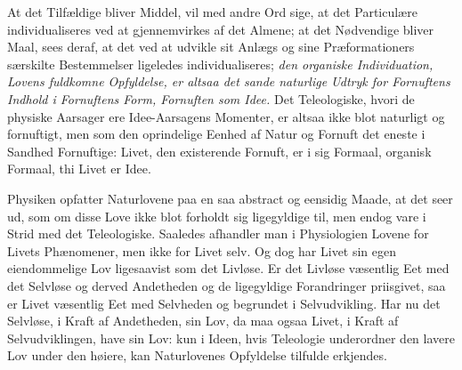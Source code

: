 \documentclass[11pt]{book}
\newcommand{\opage}[1]{\marginnote{\footnotesize\textit{[#1]}}}
\begin{document}
\opage{278} \setcounter{footnote}{0}%
At det Tilfældige bliver Middel, vil med andre Ord sige, at det Particulære
individualiseres ved at gjennemvirkes af det Almene; at det Nødvendige
bliver Maal, sees deraf, at det ved at udvikle sit Anlægs og sine
Præformationers særskilte Bestemmelser ligeledes individualiseres;
\emph{den organiske Individuation, Lovens fuldkomne Opfyldelse, er altsaa
det sande naturlige Udtryk for Fornuftens Indhold i Fornuftens Form,
Fornuften som Idee.} Det Teleologiske, hvori de physiske Aarsager ere
Idee-Aarsagens Momenter, er altsaa ikke blot naturligt og fornuftigt, men
som den oprindelige Eenhed af Natur og Fornuft det eneste i Sandhed
Fornuftige: Livet, den existerende Fornuft, er i sig Formaal, organisk
Formaal, thi Livet er Idee.

Physiken opfatter Naturlovene paa en saa abstract og eensidig Maade, at det
seer ud, som om disse Love ikke blot
\opage{279} \setcounter{footnote}{0}%
forholdt sig ligegyldige til, men endog vare i Strid med det Teleologiske.
Saaledes afhandler man i Physiologien Lovene for Livets Phænomener, men ikke
for Livet selv. Og dog har Livet sin egen eiendommelige Lov ligesaavist som
det Livløse. Er det Livløse væsentlig Eet med det Selvløse og derved
Andetheden og de ligegyldige Forandringer priisgivet, saa er Livet væsentlig
Eet med Selvheden og begrundet i Selvudvikling. Har nu det Selvløse, i Kraft
af Andetheden, sin Lov, da maa ogsaa Livet, i Kraft af Selvudviklingen, have
sin Lov: kun i Ideen, hvis Teleologie underordner den lavere Lov under den
høiere, kan Naturlovenes Opfyldelse tilfulde erkjendes.
\end{document}
